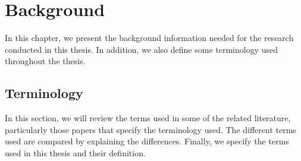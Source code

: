 \chapter{Background}\label{ch:Background}
In this chapter, we present the background information needed for the research conducted in this thesis. In addition, we also define some terminology used throughout the thesis.

\section{Terminology}
In this section, we will review the terms used in some of the related literature, particularly those papers that specify the terminology used. The different terms used are compared by explaining the differences. Finally, we specify the terms used in this thesis and their definition.

